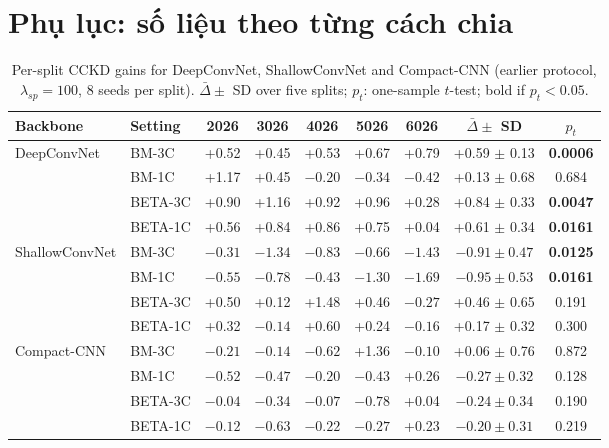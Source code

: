 \documentclass[10pt]{article} %
\begin{document}
\appendix
\section{Phụ lục: số liệu theo từng cách chia}

\begin{table}[h]
\caption{Per-split CCKD gains for DeepConvNet, ShallowConvNet and Compact-CNN (earlier protocol, $\lambda_{sp}=100$, 8 seeds per split). $\bar\Delta \pm$ SD over five splits; $p_t$: one-sample $t$-test; bold if $p_t<0.05$.}
\label{tab:multisplit_gen}
\begin{center}
\footnotesize
\begin{tabular}{llccccccc}
\toprule
Backbone & Setting & 2026 & 3026 & 4026 & 5026 & 6026 & $\bar\Delta \pm$ SD & $p_t$ \\
\midrule
\multirow{4}{*}{DeepConvNet} & BM-3C & +0.52 & +0.45 & +0.53 & +0.67 & +0.79 & +0.59 $\pm$ 0.13 & \textbf{0.0006} \\
 & BM-1C & +1.17 & +0.45 & $-0.20$ & $-0.34$ & $-0.42$ & +0.13 $\pm$ 0.68 & 0.684 \\
 & BETA-3C & +0.90 & +1.16 & +0.92 & +0.96 & +0.28 & +0.84 $\pm$ 0.33 & \textbf{0.0047} \\
 & BETA-1C & +0.56 & +0.84 & +0.86 & +0.75 & +0.04 & +0.61 $\pm$ 0.34 & \textbf{0.0161} \\
\multirow{4}{*}{ShallowConvNet} & BM-3C & $-0.31$ & $-1.34$ & $-0.83$ & $-0.66$ & $-1.43$ & $-0.91 \pm 0.47$ & \textbf{0.0125} \\
 & BM-1C & $-0.55$ & $-0.78$ & $-0.43$ & $-1.30$ & $-1.69$ & $-0.95 \pm 0.53$ & \textbf{0.0161} \\
 & BETA-3C & +0.50 & +0.12 & +1.48 & +0.46 & $-0.27$ & +0.46 $\pm$ 0.65 & 0.191 \\
 & BETA-1C & +0.32 & $-0.14$ & +0.60 & +0.24 & $-0.16$ & +0.17 $\pm$ 0.32 & 0.300 \\
\multirow{4}{*}{Compact-CNN} & BM-3C & $-0.21$ & $-0.14$ & $-0.62$ & +1.36 & $-0.10$ & +0.06 $\pm$ 0.76 & 0.872 \\
 & BM-1C & $-0.52$ & $-0.47$ & $-0.20$ & $-0.43$ & +0.26 & $-0.27 \pm 0.32$ & 0.128 \\
 & BETA-3C & $-0.04$ & $-0.34$ & $-0.07$ & $-0.78$ & +0.04 & $-0.24 \pm 0.34$ & 0.190 \\
 & BETA-1C & $-0.12$ & $-0.63$ & $-0.22$ & $-0.27$ & +0.23 & $-0.20 \pm 0.31$ & 0.219 \\
\bottomrule
\end{tabular}
\end{center}
\end{table}
\end{document}
